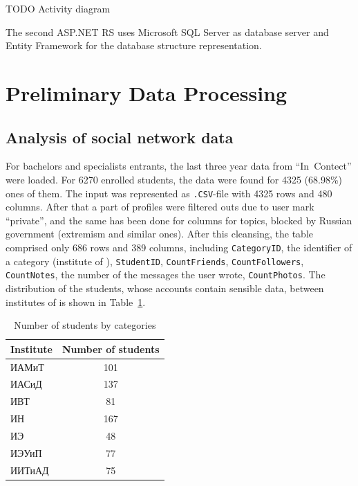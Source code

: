 \documentclass[conference,a4]{IEEEtran}
\begin{document}
TODO Activity diagram %

The second ASP.NET RS uses Microsoft SQL Server as database server and Entity Framework for the database structure representation.

\section{Preliminary Data Processing}
\label{sec:relim-proc}

\subsection{Analysis of social network data}
\label{sec:socnetan}

For bachelors and specialists entrants, the last three year data from ``In~Contect'' were loaded.  For 6270 enrolled students, the data were found for 4325 (68.98\%) ones of them.  The input was represented as \texttt{.CSV}-file with 4325 rows and 480 columns.  After that a part of profiles were filtered outs due to user mark ``private'', and the same has been done for columns for topics, blocked by Russian government (extremism and similar ones).  After this cleansing, the table comprised only 686 rows and 389 columns, including \texttt{CategoryID}, the identifier of a category (institute of \irnitu), \texttt{StudentID}, \texttt{CountFriends}, \texttt{CountFollowers}, \texttt{CountNotes}, the number of the messages the user wrote, \texttt{CountPhotos}.  The distribution of the students, whose accounts contain sensible data, between institutes of \irnitu{} is shown in Table~\ref{tab:numstudbycat}.

\begin{table}
  \caption{Number of students by categories}
  \label{tab:numstudbycat}
  \centering
  \begin{tabular}{|l|c|}
    \hline
    \textbf{Institute} & \textbf{Number of students} \\
    \hline
   ИАМиТ & 101\\
   ИАСиД & 137\\
   ИВТ & 81\\
   ИН & 167\\
   ИЭ  & 48\\
   ИЭУиП & 77\\
           ИИТиАД & 75\\
                    \hline
  \end{tabular}
\end{table}
\end{document}
